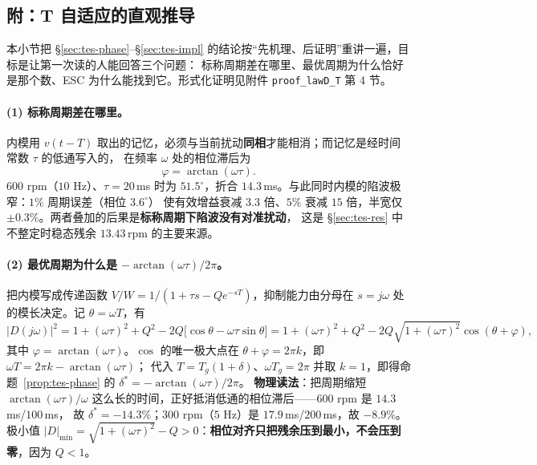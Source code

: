 \documentclass[11pt,a4paper]{article}
\theoremstyle{remark}\newtheorem{remark}{注}
\begin{document}
\subsection{附：T 自适应的直观推导}\label{sec:tes-intuition}
本小节把 §\ref{sec:tes-phase}--§\ref{sec:tes-impl} 的结论按“先机理、后证明”重讲一遍，目标是让第一次读的人能回答三个问题：
标称周期差在哪里、最优周期为什么恰好是那个数、ESC 为什么能找到它。形式化证明见附件 \texttt{proof\_lawD\_T} 第 4 节。

\paragraph{(1) 标称周期差在哪里。}
内模用 $v(t-T)$ 取出的记忆，必须与当前扰动\textbf{同相}才能相消；而记忆是经时间常数 $\tau$ 的低通写入的，
在频率 $\omega$ 处的相位滞后为
\begin{equation}
\varphi=\arctan(\omega\tau).
\label{eq:intuition-phi}
\end{equation}
600 rpm（$10$ Hz）、$\tau=20$\,ms 时为 $51.5^{\circ}$，折合 $14.3$\,ms。与此同时内模的陷波极窄：$1\%$ 周期误差（相位 $3.6^{\circ}$）
使有效增益衰减 $3.3$ 倍、$5\%$ 衰减 $15$ 倍，半宽仅 $\pm0.3\%$。两者叠加的后果是\textbf{标称周期下陷波没有对准扰动}，
这是 §\ref{sec:tes-res} 中不整定时稳态残余 $13.43$\,rpm 的主要来源。

\paragraph{(2) 最优周期为什么是 $-\arctan(\omega\tau)/2\pi$。}
把内模写成传递函数 $V/W=1/(1+\tau s-Qe^{-sT})$，抑制能力由分母在 $s=j\omega$ 处的模长决定。记 $\theta=\omega T$，有
\begin{equation}
|D(j\omega)|^{2}=1+(\omega\tau)^{2}+Q^{2}-2Q\bigl[\cos\theta-\omega\tau\sin\theta\bigr]
=1+(\omega\tau)^{2}+Q^{2}-2Q\sqrt{1+(\omega\tau)^{2}}\cos(\theta+\varphi),
\label{eq:intuition-D2}
\end{equation}
其中 $\varphi=\arctan(\omega\tau)$。$\cos$ 的唯一极大点在 $\theta+\varphi=2\pi k$，即 $\omega T=2\pi k-\arctan(\omega\tau)$；
代入 $T=T_g(1+\delta)$、$\omega T_g=2\pi$ 并取 $k=1$，即得命题~\ref{prop:tes-phase} 的 $\delta^{*}=-\arctan(\omega\tau)/2\pi$。
\textbf{物理读法}：把周期缩短 $\arctan(\omega\tau)/\omega$ 这么长的时间，正好抵消低通的相位滞后——600 rpm 是 $14.3$\,ms/$100$\,ms，
故 $\delta^{*}=-14.3\%$；300 rpm（$5$ Hz）是 $17.9$\,ms/$200$\,ms，故 $-8.9\%$。
极小值 $|D|_{\min}=\sqrt{1+(\omega\tau)^{2}}-Q>0$：\textbf{相位对齐只把残余压到最小，不会压到零}，因为 $Q<1$。
\end{document}
